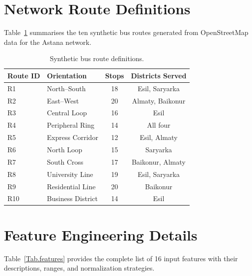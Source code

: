 \section{Network Route Definitions}
\label{app:routes}

Table~\ref{Tab.routes} summarises the ten synthetic bus routes generated from OpenStreetMap data for the Astana network.

\begin{table}[H]
\centering
\caption{Synthetic bus route definitions.}
\label{Tab.routes}
\begin{tabular}{llcc}
\toprule
Route ID & Orientation & Stops & Districts Served \\
\midrule
R1 & North--South & 18 & Esil, Saryarka \\
R2 & East--West & 20 & Almaty, Baikonur \\
R3 & Central Loop & 16 & Esil \\
R4 & Peripheral Ring & 14 & All four \\
R5 & Express Corridor & 12 & Esil, Almaty \\
R6 & North Loop & 15 & Saryarka \\
R7 & South Cross & 17 & Baikonur, Almaty \\
R8 & University Line & 19 & Esil, Saryarka \\
R9 & Residential Line & 20 & Baikonur \\
R10 & Business District & 14 & Esil \\
\bottomrule
\end{tabular}
\end{table}

\section{Feature Engineering Details}
\label{app:features}

Table~\ref{Tab.features} provides the complete list of 16 input features with their descriptions, ranges, and normalization strategies.

